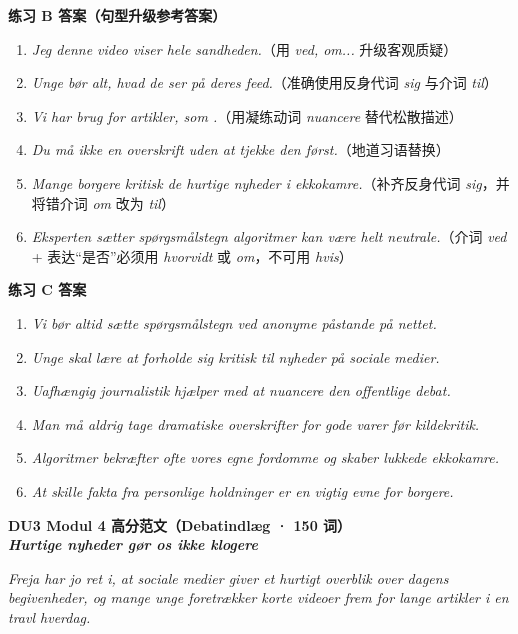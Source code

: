 \begin{answerbox}
\textbf{练习 B 答案（句型升级参考答案）}
\begin{enumerate}
  \item \textit{Jeg  denne video viser hele sandheden.}（用 \textit{ved, om...} 升级客观质疑）
  \item \textit{Unge bør  alt, hvad de ser på deres feed.}（准确使用反身代词 \textit{sig} 与介词 \textit{til}）
  \item \textit{Vi har brug for artikler, som .}（用凝练动词 \textit{nuancere} 替代松散描述）
  \item \textit{Du må ikke  en overskrift  uden at tjekke den først.}（地道习语替换）
  \item \textit{Mange borgere  kritisk  de hurtige nyheder i ekkokamre.}（补齐反身代词 \textit{sig}，并将错介词 \textit{om} 改为 \textit{til}）
  \item \textit{Eksperten sætter spørgsmålstegn  algoritmer kan være helt neutrale.}（介词 \textit{ved} + 表达“是否”必须用 \textit{hvorvidt} 或 \textit{om}，不可用 \textit{hvis}）
\end{enumerate}

\textbf{练习 C 答案}
\begin{enumerate}
  \item \textit{Vi bør altid sætte spørgsmålstegn ved anonyme påstande på nettet.}
  \item \textit{Unge skal lære at forholde sig kritisk til nyheder på sociale medier.}
  \item \textit{Uafhængig journalistik hjælper med at nuancere den offentlige debat.}
  \item \textit{Man må aldrig tage dramatiske overskrifter for gode varer før kildekritik.}
  \item \textit{Algoritmer bekræfter ofte vores egne fordomme og skaber lukkede ekkokamre.}
  \item \textit{At skille fakta fra personlige holdninger er en vigtig evne for borgere.}
\end{enumerate}

\textbf{DU3 Modul 4 高分范文（Debatindlæg · 150 词）}\\
\textit{\textbf{Hurtige nyheder gør os ikke klogere}}

\textit{Freja har jo ret i, at sociale medier giver et hurtigt overblik over dagens begivenheder, og mange unge foretrækker korte videoer frem for lange artikler i en travl hverdag.}


\end{answerbox}
